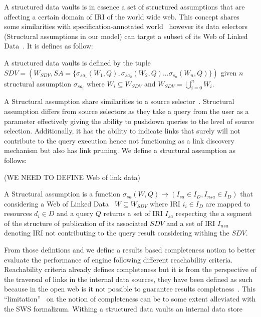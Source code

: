 A structured data vaults is in essence a set of structured assumptions that are affecting a certain domain of IRI of the world wide web.
This concept shares some similarities with specification-annotated world~\cite{Bogaerts2021LinkTW} however its data selectors (Structural assumptions in our model) can target a subset of
its Web of Linked Data~\cite{Bogaerts2021LinkTW}.
It is defines as follow:

\begin{definition}\label{def:structuredDataVaults}
A structured data vaults is defined by the tuple~\newline $SDV = (W_{SDV}, SA = \{\sigma_{sa_1}(W_1, Q), \sigma_{sa_2}(W_2, Q)...\sigma_{s_n}(W_n, Q)\})$ given 
$n$ structural assumption $\sigma_{sa_i}$ where $W_i  \subseteq W_{SDV}$ and $W_{SDV} = \bigcup_{i=0}^{n}W_i$.
\end{definition}

A Structural assumption share similarities to a source selector~\cite{Bogaerts2021LinkTW}.
Structural assumption differs from source selectors as they take a query from the user as a parameter
effectively giving the ability to pushdown queries to the level of source selection.
Additionally, it has the ability to indicate links that surely will not contribute to the query execution hence 
not functioning as a link discovery mechanism but also has link pruning.
We define a structural assumption as follows:

(WE NEED TO DEFINE Web of link data)
\begin{definition}\label{def:structuralAssumption}
A Structural assumption is a function $\sigma_{sa}(W,Q) \rightarrow (I_{sa}\in I_D, I_{nsa} \in I_D)$ that considering a Web of Linked Data~\cite{Bogaerts2021LinkTW} $W \subseteq W_{SDV}$ 
where IRI $i_i \in I_D$ are mapped to resources $d_i \in D$ and a query $Q$ returns a set of IRI $I_{sa}$ respecting the a segment of the structure of publication of 
its associated $SDV$ and a set of IRI $I_{nsa}$ denoting IRI not contributing to the query result considering withing the $SDV$.
\end{definition}

From those defintions and we define a results based completeness notion to better evaluate the performance of engine following different reachability criteria.
Reachability criteria already defines completeness but it is from the perspective of the traversal of links in the internal data sources,
they have been defined as such because in the open web is it not possible to guarantee results completness~\cite{Hartig2012}.
This ``limitation''~\cite{Hartig2012} on the notion of completeness can be to some extent alleviated with the SWS formalizum.
Withing a structured data vaults an internal data store 

